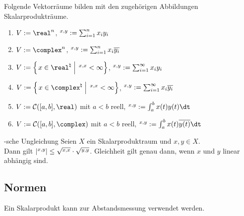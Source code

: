 \begin{Bsp}
    Folgende Vektorräume bilden mit den zugehörigen Abbildungen Skalarprodukträume.
    \begin{enumerate}[label=\emph{(\alph*)}]
        \item
        $V := \real^n$, $\sp{x, y} := \sum_{i=1}^n x_i y_i$

        \item
        $V := \complex^n$, $\sp{x, y} := \sum_{i=1}^n x_i \overline{y_i}$

        \item
        $V := \left\{\left.x \in \real^\natural \;\right|\; \sp{x, x} < \infty\right\}$,
        $\sp{x, y} := \sum_{i=1}^\infty x_i y_i$

        \item
        $V := \left\{\left.x \in \complex^\natural \;\right|\; \sp{x, x} < \infty\right\}$,
        $\sp{x, y} := \sum_{i=1}^\infty x_i \overline{y_i}$

        \item
        $V := \C([a,b], \real)$ mit $a < b$ reell, $\sp{x, y} := \int_a^b x(t)y(t)\dt$

        \item
        $V := \C([a,b], \complex)$ mit $a < b$ reell, $\sp{x, y} := \int_a^b x(t)\kk{y(t)}\dt$
    \end{enumerate}
\end{Bsp}

\begin{Satz}{-sche Ungleichung}
    Seien $X$ ein Skalarproduktraum und $x, y \in X$.\\
    Dann gilt $|\sp{x, y}| \le \sqrt{\sp{x, x}} \cdot \sqrt{\sp{y, y}}$.
    Gleichheit gilt genau dann, wenn $x$ und $y$ linear abhängig sind.
\end{Satz}

\subsection{%
    Normen%
}

\begin{Bem}
    Ein Skalarprodukt kann zur Abstandsmessung verwendet werden.
\end{Bem}

